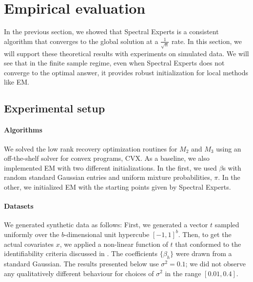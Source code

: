 \section{Empirical evaluation}
\label{sec:evaluation}

In the previous section, we showed that Spectral Experts is a consistent
algorithm that converges to the global solution at a $\frac{1}{\sqrt n}$
rate. In this section, we will support these theoretical results with
experiments on simulated data. We will see that in the finite sample
regime, even when Spectral Experts does not converge to the optimal
answer, it provides robust initialization for local methods like EM.

\subsection{Experimental setup}

\paragraph{Algorithms}

We solved the low rank recovery optimization routines for $M_2$ and
$M_3$ using an off-the-shelf solver for convex programs, CVX\cite{cvx}.
As a baseline, we also implemented EM with two different
initializations. In the first, we used $\beta$s with random standard
Gaussian entries and uniform mixture probabilities, $\pi$. In the other,
we initialized EM with the starting points given by Spectral Experts. 

\paragraph{Datasets}

We generated synthetic data as follows:
First, we generated a vector $t$ sampled uniformly over the $b$-dimensional
unit hypercube $[-1,1]^b$.
Then, to get the actual covariates $x$, we applied a non-linear function of $t$
that conformed to the identifiability criteria discussed in
.
The coefficients $\{\beta_h\}$ were drawn from a standard Gaussian. The
results presented below use $\sigma^2 = 0.1$; we did not observe any
qualitatively different behaviour for choices of $\sigma^2$ in the range
$[0.01, 0.4]$.  

